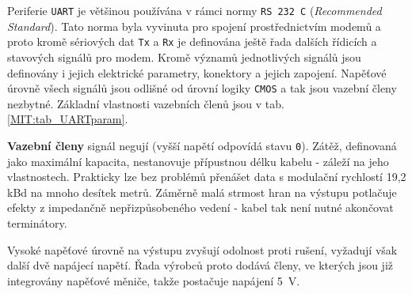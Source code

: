         Periferie \texttt{UART} je většinou používána v rámci normy \texttt{RS 232 C}
        (\emph{Recommended Standard}). Tato norma byla vyvinuta pro spojení prostřednictvím modemů a
        proto kromě sériových dat \texttt{Tx} a \texttt{Rx} je definována ještě řada dalších
        řídicích a stavových signálů pro modem. Kromě významů jednotlivých signálů jsou definovány i
        jejich elektrické parametry, konektory a jejich zapojení. Napěťové úrovně všech signálů jsou
        odlišné od úrovní logiky \texttt{CMOS} a tak jsou vazební členy nezbytné. Základní
        vlastnosti vazebních členů jsou v tab. \ref{MIT:tab_UARTparam}.
        
        \textbf{Vazební členy} signál negují (vyšší napětí odpovídá stavu \texttt{0}). Zátěž,
        definovaná jako maximální kapacita, nestanovuje přípustnou délku kabelu - záleží na jeho
        vlastnostech. Prakticky lze bez problémů přenášet data s modulační rychlostí 19,2 kBd na
        mnoho desítek metrů. Záměrně malá strmost hran na výstupu potlačuje efekty z impedančně
        nepřizpůsobeného vedení - kabel tak není nutné akončovat terminátory.
        
        \begin{table}[ht!]
          \centering
          \caption{Elektrické parametry vazebních členů \texttt{RS 232}}
          \label{MIT:tab_UARTparam}
        \end{table}
                  
        Vysoké napěťové úrovně na výstupu zvyšují odolnost proti rušení, vyžadují však další dvě 
        napájecí napětí. Řada výrobců proto dodává členy, ve kterých jsou již integrovány napěťové 
        měniče, takže postačuje napájení \qty{5}{\volt}.
        
